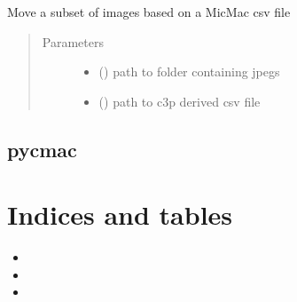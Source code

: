 \documentclass[letterpaper,10pt,english]{sphinxmanual}
\begin{document}

\begin{fulllineitems}
\label{\detokenize{pycmac:utilities.mv_subset}}
Move a subset of images based on a MicMac csv file
\begin{quote}\begin{description}
\item[{Parameters}] \leavevmode\begin{itemize}
\item {} 
 () \textendash{} path to folder containing jpegs

\item {} 
 () \textendash{} path to c3p derived csv file

\end{itemize}

\end{description}\end{quote}

\end{fulllineitems}



\section{pycmac}
\label{\detokenize{modules:pycmac}}\label{\detokenize{modules::doc}}

\chapter{Indices and tables}
\label{\detokenize{index:indices-and-tables}}\begin{itemize}
\item {} 

\item {} 

\item {} 

\end{itemize}
\end{document}
